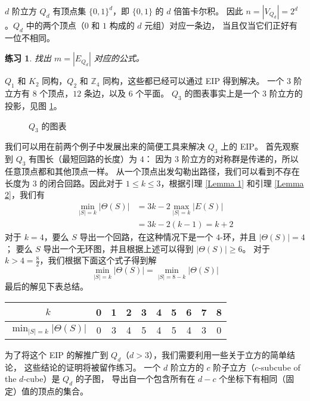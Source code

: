 \documentclass[12pt, a4paper]{article}
\newtheorem{exercise}{练习}
\begin{document}
$d$ 阶立方 $Q_d$ 有顶点集 $\{0, 1\}^d$，即 $\{0, 1\}$ 的 $d$ 倍笛卡尔积。
因此 $n = |V_{Q_d}| = 2^d$。$Q_d$ 中的两个顶点（$0$ 和 $1$ 构成的 $d$ 元组）对应一条边，
当且仅当它们正好有一位不相同。

\begin{exercise}
\label{Exercise 2}
找出 $m = |E_{Q_d}|$ 对应的公式。
\end{exercise}

$Q_1$ 和 $K_2$ 同构，$Q_2$ 和 $\mathbb{Z}_4$ 同构，这些都已经可以通过 EIP 得到解决。
一个 $3$ 阶立方有 $8$ 个顶点，$12$ 条边，以及 $6$ 个平面。
$Q_3$ 的图表事实上是一个 $3$ 阶立方的投影，见图 \ref{Figure 2}。

\begin{figure}
	\centering
	
	\caption{$Q_3$ 的图表}
	\label{Figure 2}
\end{figure}

我们可以用在前两个例子中发展出来的简便工具来解决 $Q_3$ 上的 EIP。
首先观察到 $Q_3$ 有围长（最短回路的长度）为 $4$：
因为 $3$ 阶立方的对称群是传递的，所以任意顶点都和其他顶点一样。
从一个顶点出发勾勒出路径，我们可以看到不存在长度为 $3$ 的闭合回路。因此对于
$1 \le k \le 3$，根据引理 \ref{Lemma 1} 和引理 \ref{Lemma 2}，我们有
\begin{align*}
\min_{|S| = k} |\Theta(S)| & = 3 k - 2 \max_{|S| = k} |E(S)| \\
			   & = 3 k - 2 (k - 1) = k + 2
\end{align*}
对于 $k = 4$，要么 $S$ 导出一个回路，在这种情况下是一个 $4$-环，并且 $|\Theta(S)| = 4$；
要么 $S$ 导出一个无环图，并且根据上述可以得到 $|\Theta(S)| \ge 6$。
对于 $k > 4 = \frac{8}{2}$，我们根据下面这个式子得到解
\begin{equation*}
\min_{|S| = k} |\Theta(S)| = \min_{|S| = 8 - k} |\Theta(S)|
\end{equation*}
最后的解见下表总结。
\begin{center}
	\begin{tabular}{ c | c c c c c c c c c }
	$k$                          & 0 & 1 & 2 & 3 & 4 & 5 & 6 & 7 & 8 \\
	\hline
	$\min_{|S| = k} |\Theta(S)|$ & 0 & 3 & 4 & 5 & 4 & 5 & 4 & 3 & 0
	\end{tabular}
\end{center}

为了将这个 EIP 的解推广到 $Q_d$（$d > 3$），我们需要利用一些关于立方的简单结论，
这些结论的证明将被留作练习。
一个 $d$ 阶立方的 $c$ 阶子立方（$c$-subcube of the $d$-cube）是 $Q_d$ 的子图，
导出自一个包含所有在 $d − c$ 个坐标下有相同（固定）值的顶点的集合。
\end{document}
